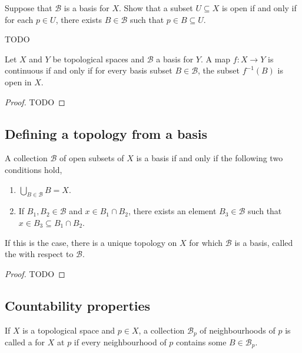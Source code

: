 \begin{exercise}
	\begin{problem}
	Suppose that $ \mathcal{B} $ is a basis for $ X $. Show that a subset $ U \subseteq X $ is open if and only if for each $ p \in U $, there exists $ B \in \mathcal{B} $ such that $ p \in B \subseteq U $.
	\end{problem}
	\begin{solution}
		TODO
	\end{solution}
\end{exercise}

\begin{proposition}
	Let $ X $ and $ Y $ be topological spaces and $ \mathcal{B} $ a basis for $ Y $. A map $ f:X \to Y $ is continuous if and only if for every basis subset $ B \in \mathcal{B} $, the subset $ f ^{-1}( B ) $ is open in $ X $.
	\begin{proof}
		TODO
	\end{proof}
\end{proposition}

\subsection{Defining a topology from a basis}
\begin{proposition}
	A collection $ \mathcal{B} $ of open subsets of $ X $ is a basis if and only if the following two conditions hold,
	\begin{enumerate}
		\item $ \bigcup_{B \in \mathcal{B}}^{}{B} = X $.
		\item If $ B_{1}, B_{2} \in \mathcal{B} $ and $ x \in B_{1}\cap B_{2} $, there exists an element $ B_{3}\in \mathcal{B} $ such that $ x \in B_{3} \subseteq B_{1}\cap B_{2} $.
	\end{enumerate}
	If this is the case, there is a unique topology on $ X $ for which $ \mathcal{B} $ is a basis, called the  with respect to $ \mathcal{B} $.
	\begin{proof}
		TODO
	\end{proof}
\end{proposition}

\subsection{Countability properties}
\begin{definition}
	If $ X $ is a topological space and $ p \in X $, a collection $ \mathcal{B}_{p} $ of neighbourhoods of $ p $ is called a  for $ X $ at $ p $ if every neighbourhood of $ p $ contains some $ B \in \mathcal{B}_{p} $.
\end{definition}

